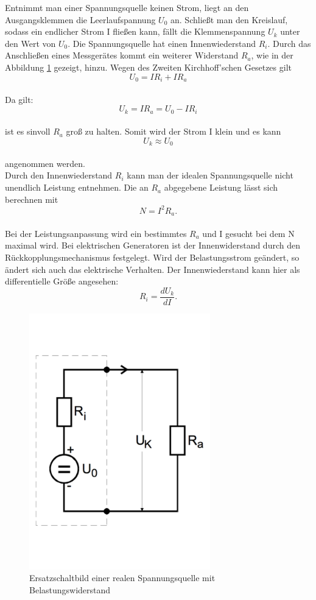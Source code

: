Entnimmt man einer Spannungsquelle keinen Strom, liegt an den Ausgangsklemmen die Leerlaufspannung $U_0$ an.
Schließt man den Kreislauf, sodass ein endlicher Strom I fließen kann, fällt die Klemmenspannung $U_k$ unter den Wert von $U_0$.
Die Spannungsquelle hat einen Innenwiederstand $R_i$.
Durch das Anschließen eines Messgerätes kommt ein weiterer Widerstand $R_a$, wie in der Abbildung \ref{fig:Monozelle} gezeigt, hinzu. Wegen des Zweiten Kirchhoff'schen Gesetzes gilt
\begin{equation*}
U_0 = IR_i+IR_a
\end{equation*}
\\Da gilt:
\begin{equation}
U_k = IR_a = U_0-IR_i
\label{eqn:klemme}
\end{equation}
\\ist es sinvoll $R_a$ groß zu halten. Somit wird der Strom I klein und es kann
\begin{equation*}
U_k \approx U_0
\end{equation*}
\\angenommen werden.
\\Durch den Innenwiederstand $R_i$ kann man der idealen Spannungsquelle nicht unendlich Leistung entnehmen. Die an $R_a$ abgegebene Leistung lässt sich berechnen mit
\begin{equation*}
  N = I^2R_a.
\end{equation*}
\\Bei der Leistungsanpassung wird ein bestimmtes $R_a$ und I gesucht bei dem N maximal wird.
Bei elektrischen Generatoren ist der Innenwiderstand durch den Rückkopplungsmechanismus festgelegt. Wird der Belastungsstrom geändert, so ändert sich auch das elektrische Verhalten.
Der Innenwiederstand kann hier als differentielle Größe angesehen:
\begin{equation*}
R_i = \frac{dU_k}{dI}.
\end{equation*}
\begin{figure}[h!]
  \centering
  \includegraphics[width=0.7\textwidth]{Monozelle.pdf}
  \caption{Ersatzschaltbild einer realen Spannungsquelle mit Belastungswiderstand \cite{1}}
  \label{fig:Monozelle}
\end{figure}
